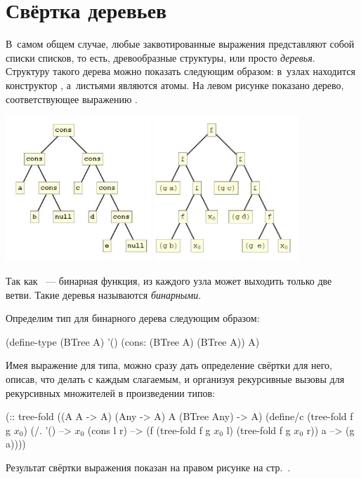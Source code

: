 \section[2]{Свёртка деревьев}%
В~самом общем случае, любые заквотированные выражения представляют собой списки списков, то есть, древообразные структуры, или просто \emph{деревья}. Структуру такого дерева можно показать следующим образом: в~узлах находится конструктор , а~листьями являются атомы. На левом рисунке показано дерево, соответствующее выражению .
\begin{center}\label{fig:tree}
  \includegraphics[width=0.41\textwidth]{../figures/tree1.jpg}
  \qquad
  \includegraphics[width=0.41\textwidth]{../figures/tree4.jpg}
\end{center}

Так как ~--- бинарная функция, из каждого узла может выходить только две ветви. Такие деревья называются \emph{бинарными}. 

Определим тип для бинарного дерева следующим образом:
\begin{Definition}
(define-type (BTree A)
  '()
  (cons: (BTree A) (BTree A))
  A)
\end{Definition}

Имея выражение для типа, можно сразу дать определение свёртки для него, описав, что делать с каждым слагаемым, и организуя рекурсивные вызовы для рекурсивных множителей в произведении типов:
\begin{Definition}[emph={f,g,a,l,r}]
(:: tree-fold ((A A -> A) (Any -> A) A (BTree Any) -> A)
 (define/c (tree-fold f g $x_0$)
   (/. '() --> $x_0$
       (cons l r) --> (f (tree-fold f g $x_0$ l) 
                        (tree-fold f g $x_0$ r))
       a --> (g a))))
\end{Definition}
Результат свёртки выражения  показан на правом рисунке на стр.~\pageref{fig:tree}.

